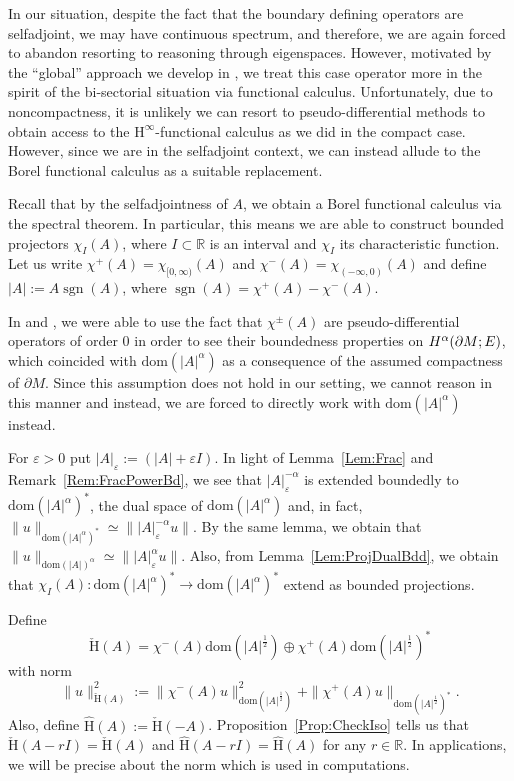 \documentclass[a4paper,10pt,reqno]{amsart}
\newcommand{\R}{\mathbb{R}}
\newcommand{\modulus}[1]{|#1|}
\newcommand{\norm}[1]{\| #1 \|}%
\newcommand{\Hard}[2][{}]{{\rm H}^{#2}_{\rm #1}}%
\newcommand{\SobH}[2][{}]{\Hard[#1]{\rm #2}}
\newcommand{\checkH}{\check{\mathrm{H}}}
\newcommand{\hatH}{\hat{\mathrm{H}}}
\newcommand{\dom}{\mathrm{dom}}
\DeclareMathOperator{\sgn}{sgn}%
\renewcommand{\epsilon}{\varepsilon}
\newcommand{\Hinfty}{$\mathrm{H}^\infty$}
\newcommand{\dM}{\partial M}
\theoremstyle{definition}
\begin{document}
In our situation, despite the fact that the boundary defining operators are selfadjoint, we may have continuous spectrum, and therefore, we are again forced to abandon resorting to reasoning through eigenspaces.
However, motivated by the ``global'' approach we develop in \cite{BBan}, we treat this case operator more in the spirit of the bi-sectorial situation via functional calculus.
Unfortunately, due to noncompactness, it is unlikely we can resort to pseudo-differential methods to obtain access to the \Hinfty-functional calculus as we did in the compact case.
However, since we are in the selfadjoint context, we can instead allude to the Borel functional calculus as a suitable replacement.

Recall that by the selfadjointness of $A$, we obtain a Borel functional calculus via the spectral theorem.
In particular, this means we are able to construct bounded projectors $\chi_{I}(A)$, where $I \subset \R$ is an interval and $\chi_I$ its characteristic function.
Let us write $\chi^+(A) = \chi_{[0,\infty)}(A)$ and $\chi^-(A) = \chi_{(-\infty, 0)}(A)$ and define $\modulus{A} := A \sgn(A)$, where $\sgn(A) = \chi^+(A) - \chi^{-}(A)$.


In \cite{BB12} and \cite{BBan}, we were able to use the fact that $\chi^{\pm}(A)$ are pseudo-differential operators of order $0$ in order to see their boundedness properties on $\SobH{\alpha}(\dM;E)$, which coincided with $\dom(\modulus{A}^\alpha)$ as a consequence of the assumed compactness of $\dM$.
Since this assumption does not hold in our setting, we cannot reason in this manner and instead, we are forced to directly work with $\dom(\modulus{A}^\alpha)$ instead.

For $\epsilon>0$ put $|A|_\epsilon := (|A|+\epsilon I)$.
In light of Lemma~\ref{Lem:Frac} and Remark~\ref{Rem:FracPowerBd}, we see that $\modulus{A}_\epsilon^{-\alpha}$ is extended boundedly to $\dom(\modulus{A}^\alpha)^\ast$, the dual space of $\dom(\modulus{A}^\alpha)$ and, in fact,  $\norm{u}_{\dom(\modulus{A}^\alpha)^\ast} \simeq \norm{ \modulus{A}_\epsilon^{-\alpha} u}$.
By the same lemma, we obtain that $\norm{u}_{\dom(\modulus{A})^\alpha} \simeq \norm{\modulus{A}_\epsilon^\alpha u}$.
Also, from Lemma~\ref{Lem:ProjDualBdd}, we obtain that $\chi_{I}(A): \dom(\modulus{A}^\alpha)^\ast \to \dom(\modulus{A}^\alpha)^\ast$ extend as bounded projections.

Define
\begin{equation}
\label{Eq:Check}
\checkH(A) = \chi^{-}(A) \dom(\modulus{A}^{\frac12}) \oplus\chi^{+}(A) \dom(\modulus{A}^{\frac12})^\ast
\end{equation}
with norm
\begin{equation}
\norm{u}_{\checkH(A)}^2 := \norm{\chi^{-}(A)u}^2_{\dom(\modulus{A}^{\frac12})} + \norm{\chi^+(A)u}_{\dom(\modulus{A}^{\frac12})^\ast}.
\end{equation}
Also, define $\hatH(A) := \checkH(-A)$.
Proposition~\ref{Prop:CheckIso} tells us that $\checkH(A-rI) = \checkH(A)$ and $\hatH(A-rI) = \hatH(A)$ for any $r\in\R$.
In applications, we will be precise about the norm which is used in computations.
\end{document}
